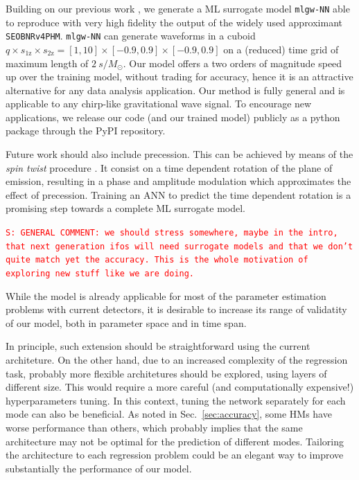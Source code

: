 \documentclass[twocolumn,showpacs,preprintnumbers,nofootinbib,prd,
superscriptaddress,10pt]{revtex4-1}
\newcommand{\stefano}[1]{{\textcolor{red}{\texttt{S: #1}} }}
\begin{document}
{Building on our previous work \cite{Schmidt:2020yuu}, we generate a ML surrogate model \texttt{mlgw-NN} able to reproduce with very high fidelity the output of the widely used approximant \texttt{SEOBNRv4PHM}. \texttt{mlgw-NN} can generate waveforms in a cuboid $q\times s_\text{1z} \times s_\text{2z} = [1,10]\times[-0.9,0.9]\times[-0.9,0.9]$ on a (reduced) time grid of maximum length of $\SI{2}{s/M_\odot}$.
Our model offers a two orders of magnitude speed up over the training model, without trading for accuracy, hence it is an attractive alternative for any data analysis application.
Our method is fully general and is applicable to any chirp-like gravitational wave signal.
To encourage new applications, we release our code (and our trained model) publicly as a python package through the PyPI repository.

Future work should also include precession. This can be achieved by means of the {\it spin twist} procedure \cite{}. It consist on a time dependent rotation of the plane of emission, resulting in a phase and amplitude modulation which approximates the effect of precession.
Training an ANN to predict the time dependent rotation is a promising step towards a complete ML surrogate model.

\stefano{GENERAL COMMENT: we should stress somewhere, maybe in the intro, that next generation ifos will need surrogate models and that we don't quite match yet the accuracy. This is the whole motivation of exploring new stuff like we are doing.}

While the model is already applicable for most of the parameter estimation problems with current detectors, it is desirable to increase its range of validatity of our model, both in parameter space and in time span.

In principle, such extension should be straightforward using the current architeture. On the other hand, due to an increased complexity of the regression task, probably more flexible architetures should be explored, using layers of different size. This would require a more careful (and computationally expensive!) hyperparameters tuning.
In this context, tuning the network separately for each mode can also be beneficial. As noted in Sec.~\ref{sec:accuracy}, some HMs have worse performance than others, which probably implies that the same architecture may not be optimal for the prediction of different modes.
Tailoring the architecture to each regression problem could be an elegant way to improve substantially the performance of our model.

}
\end{document}
